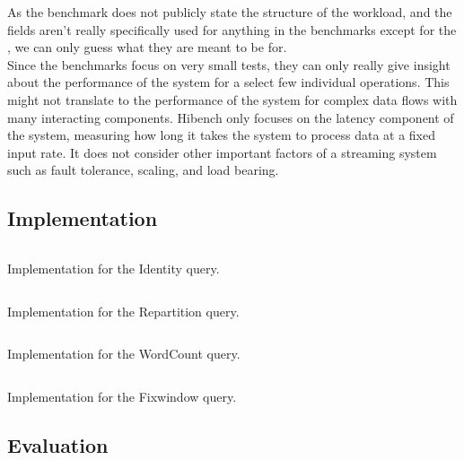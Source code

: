 As the benchmark does not publicly state the structure of the workload, and the fields aren't really specifically used for anything in the benchmarks except for the , we can only guess what they are meant to be for. \\

Since the benchmarks focus on very small tests, they can only really give insight about the performance of the system for a select few individual operations. This might not translate to the performance of the system for complex data flows with many interacting components. Hibench only focuses on the latency component of the system, measuring how long it takes the system to process data at a fixed input rate. It does not consider other important factors of a streaming system such as fault tolerance, scaling, and load bearing.


\subsection{Implementation}

\begin{listing}[H]
  \inputminted[firstline=80,lastline=82]{rust}{benchmarks/src/hibench.rs}
  \caption{Implementation for the Identity query.}
  \label{lst:hibench-identity}
\end{listing}

\begin{listing}[H]
  \inputminted[firstline=109,lastline=123]{rust}{benchmarks/src/hibench.rs}
  \caption{Implementation for the Repartition query.}
  \label{lst:hibench-repartition}
\end{listing}

\begin{listing}[H]
  \inputminted[firstline=150,lastline=153]{rust}{benchmarks/src/hibench.rs}
  \caption{Implementation for the WordCount query.}
  \label{lst:hibench-wordcount}
\end{listing}

\begin{listing}[H]
  \inputminted[firstline=180,lastline=194]{rust}{benchmarks/src/hibench.rs}
  \caption{Implementation for the Fixwindow query.}
  \label{lst:hibench-fixwindow}
\end{listing}

\subsection{Evaluation}



